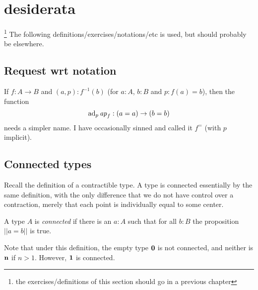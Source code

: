 
\section{desiderata}\footnote{the exercises/definitions of this section should go in a previous chapter}
The following definitions/exercises/notations/etc is used, but should probably be elsewhere.

\subsection{Request wrt notation}
\label{sec:requestnotation}

If $f:A\to B$ and $(a,p):f^{-1}(b)$ (for $a:A$, $b:B$ and $p:f(a)=b$), then the function
$$\mathrm{ad}_p\mathop{{\it ap}_{f}}:(a=a)\to(b=b)$$
needs a simpler name.  I have occasionally sinned and called it $f^=$ (with $p$ implicit).  

\subsection{Connected types}
\label{sec:connectedtypes}
Recall the definition of a contractible type.  A type is connected essentially by the same definition, with the only difference that we do not have control over a contraction, merely that each point is individually equal to some center.
\begin{definition}\label{def:connected}
A type $A$ is \emph{connected} if there is an $a:A$ such that for all $b:B$ the proposition $||a=b||$ is true.  
\end{definition}
Note that under this definition, the empty type $\mathbf{0} $ is not connected, and neither is $\mathbf{n} $ if $n>1$. However, $\mathbf{1} $ is connected.

